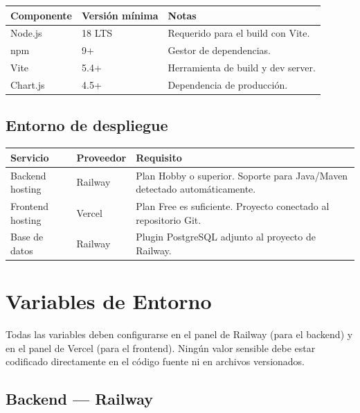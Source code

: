 \documentclass[11pt, a4paper]{article}
\begin{document}
\begin{center}
\begin{tabular}{L{5cm} L{4cm} L{4.5cm}}
\toprule
\textbf{Componente} & \textbf{Versión mínima} & \textbf{Notas} \\
\midrule
Node.js    & 18 LTS  & Requerido para el build con Vite. \\
npm        & 9+      & Gestor de dependencias. \\
Vite       & 5.4+    & Herramienta de build y dev server. \\
Chart.js   & 4.5+    & Dependencia de producción. \\
\bottomrule
\end{tabular}
\end{center}

\subsection{Entorno de despliegue}

\begin{center}
\begin{tabular}{L{4cm} L{4cm} L{5.5cm}}
\toprule
\textbf{Servicio} & \textbf{Proveedor} & \textbf{Requisito} \\
\midrule
Backend hosting  & Railway  & Plan Hobby o superior. Soporte para Java/Maven detectado automáticamente. \\
Frontend hosting & Vercel   & Plan Free es suficiente. Proyecto conectado al repositorio Git. \\
Base de datos    & Railway  & Plugin PostgreSQL adjunto al proyecto de Railway. \\
\bottomrule
\end{tabular}
\end{center}

\section{Variables de Entorno}

Todas las variables deben configurarse en el panel de Railway (para el backend) y en el panel de Vercel (para el frontend). Ningún valor sensible debe estar codificado directamente en el código fuente ni en archivos versionados.

\subsection{Backend --- Railway}
\end{document}
